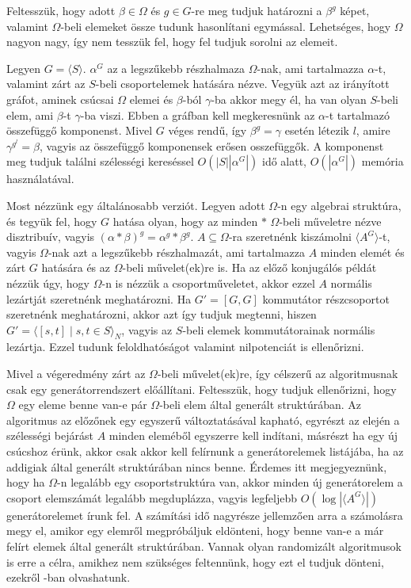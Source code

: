 Feltesszük, hogy adott $\beta\in\Omega$ és $g\in G$-re meg tudjuk határozni a $\beta^g$ képet, valamint $\Omega$-beli
elemeket össze tudunk hasonlítani egymással. Lehetséges, hogy $\Omega$ nagyon nagy, így nem tesszük fel, hogy fel tudjuk sorolni az elemeit.

Legyen $G=\langle S\rangle$. $\alpha^G$ az a legszűkebb részhalmaza $\Omega$-nak, ami tartalmazza $\alpha$-t, valamint zárt az $S$-beli csoportelemek hatására nézve.
Vegyük azt az irányított gráfot, aminek csúcsai $\Omega$ elemei és $\beta$-ból $\gamma$-ba akkor megy él, ha van olyan $S$-beli elem, ami $\beta$-t $\gamma$-ba viszi.
Ebben a gráfban kell megkeresnünk az $\alpha$-t tartalmazó összefüggő komponenst.
Mivel $G$ véges rendű, így $\beta^g=\gamma$ esetén létezik $l$, amire $\gamma^{g^l}=\beta$, vagyis az összefüggő komponensek erősen osszefüggők.
A komponenst meg tudjuk találni szélességi kereséssel $O(|S| |\alpha^G|)$ idő alatt, $O(|\alpha^G|)$ memória használatával.

Most nézzünk egy általánosabb verziót.
Legyen adott $\Omega$-n egy algebrai struktúra, és tegyük fel, hogy $G$ hatása olyan, hogy az minden $*$ $\Omega$-beli műveletre nézve disztribuív,
vagyis $(\alpha * \beta)^g = \alpha^g * \beta^g$.
$A \subseteq \Omega$-ra szeretnénk kiszámolni $\langle A^G \rangle$-t, vagyis
$\Omega$-nak azt a legszűkebb részhalmazát, ami tartalmazza $A$ minden elemét és zárt $G$ hatására és az $\Omega$-beli művelet(ek)re is.
Ha az előző konjugálós példát nézzük úgy, hogy $\Omega$-n is nézzük a csoportműveletet, akkor ezzel $A$ normális lezártját szeretnénk meghatározni.
Ha $G'=[G,G]$ kommutátor részcsoportot szeretnénk meghatározni,
akkor azt így tudjuk megtenni, hiszen $G'=\langle[s,t] \mid s,t \in S\rangle_N$, vagyis az $S$-beli elemek kommutátorainak normális lezártja.
Ezzel tudunk feloldhatóságot valamint nilpotenciát is ellenőrizni.

Mivel a végeredmény zárt az $\Omega$-beli művelet(ek)re, így célszerű az algoritmusnak csak egy generátorrendszert előállítani.
Feltesszük, hogy tudjuk ellenőrizni, hogy $\Omega$ egy eleme benne van-e pár $\Omega$-beli elem által generált struktúrában.
Az algoritmus az előzőnek egy egyszerű változtatásával kapható, egyrészt az elején a szélességi bejárást $A$ minden eleméből egyszerre kell indítani,
másrészt ha egy új csúcshoz érünk, akkor csak akkor kell felírnunk a generátorelemek listájába, ha az addigiak által generált struktúrában nincs benne.
Érdemes itt megjegyeznünk, hogy ha $\Omega$-n legalább egy csoportstruktúra van, akkor minden új generátorelem a csoport elemszámát legalább megduplázza,
vagyis legfeljebb $O(\log|\langle A^G\rangle |)$ generátorelemet írunk fel. A számítási idő nagyrésze jellemzően arra a számolásra megy el, amikor egy elemről
megpróbáljuk eldönteni, hogy benne van-e a már felírt elemek által generált struktúrában. Vannak olyan randomizált algoritmusok is erre a célra, amikhez nem szükséges feltennünk,
hogy ezt el tudjuk dönteni, ezekről \cite{Ser03}-ban olvashatunk.

